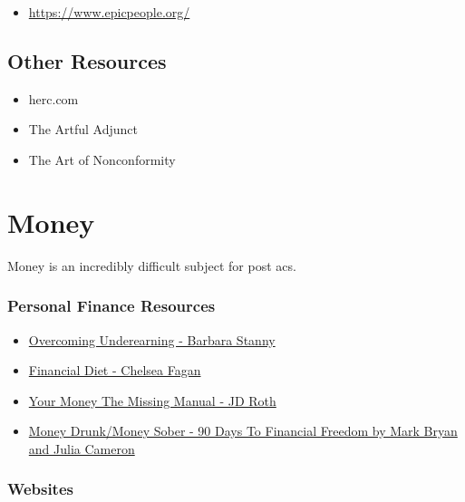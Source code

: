 \documentclass[]{book}
\providecommand{\tightlist}{%
  \setlength{\itemsep}{0pt}\setlength{\parskip}{0pt}}
\theoremstyle{definition}
\theoremstyle{definition}
\theoremstyle{definition}
\theoremstyle{remark}
\begin{document}
\begin{itemize}
\tightlist
\item
  \url{https://www.epicpeople.org/}
\end{itemize}

\section{Other Resources}\label{other-resources}

\begin{itemize}
\tightlist
\item
  herc.com
\item
  The Artful Adjunct
\item
  The Art of Nonconformity
\end{itemize}

\chapter{Money}\label{money}

Money is an incredibly difficult subject for post acs.

\subsection{Personal Finance
Resources}\label{personal-finance-resources}

\begin{itemize}
\tightlist
\item
  \href{https://www.harpercollins.com/9780061856662/overcoming-underearningtm/}{Overcoming
  Underearning - Barbara Stanny}
\item
  \href{http://thefinancialdiet.com/author/chelsea-fagan/}{Financial
  Diet - Chelsea Fagan}
\item
  \href{http://shop.oreilly.com/product/9780596809416.do}{Your Money The
  Missing Manual - JD Roth}\\
\item
  \href{https://www.penguinrandomhouse.com/books/20308/money-drunkmoney-sober-by-mark-bryan-and-julia-cameron/9780345432650/}{Money
  Drunk/Money Sober - 90 Days To Financial Freedom by Mark Bryan and
  Julia Cameron}
\end{itemize}

\subsection{Websites}\label{websites-1}
\end{document}
